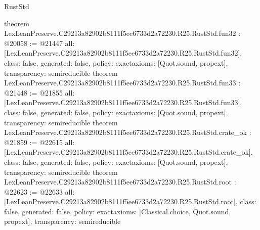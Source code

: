 \begin{lexlean}{RustStd}
\begin{coremodule}
{}
theorem LexLeanPreserve.C29213a82902b8111f5ee6733d2a72230.R25.RustStd.fun32 : @20058 := @21447 {
  all: [LexLeanPreserve.C29213a82902b8111f5ee6733d2a72230.R25.RustStd.fun32],
  class: false,
  generated: false,
  policy: exact{axioms: [Quot.sound, propext]},
  transparency: semireducible
}
theorem LexLeanPreserve.C29213a82902b8111f5ee6733d2a72230.R25.RustStd.fun33 : @21448 := @21855 {
  all: [LexLeanPreserve.C29213a82902b8111f5ee6733d2a72230.R25.RustStd.fun33],
  class: false,
  generated: false,
  policy: exact{axioms: [Quot.sound, propext]},
  transparency: semireducible
}
theorem LexLeanPreserve.C29213a82902b8111f5ee6733d2a72230.R25.RustStd.crate_ok : @21859 := @22615 {
  all: [LexLeanPreserve.C29213a82902b8111f5ee6733d2a72230.R25.RustStd.crate_ok],
  class: false,
  generated: false,
  policy: exact{axioms: [Quot.sound, propext]},
  transparency: semireducible
}
theorem LexLeanPreserve.C29213a82902b8111f5ee6733d2a72230.R25.RustStd.root : @22623 := @22633 {
  all: [LexLeanPreserve.C29213a82902b8111f5ee6733d2a72230.R25.RustStd.root],
  class: false,
  generated: false,
  policy: exact{axioms: [Classical.choice, Quot.sound, propext]},
  transparency: semireducible
}


\end{coremodule}
\end{lexlean}
